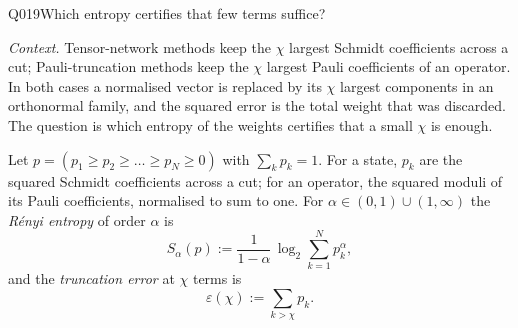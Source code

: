 \begin{entry}{Q019}{Which entropy certifies that few terms suffice?}


\begin{problem}
\emph{Context.} Tensor-network methods keep the $\chi$ largest Schmidt coefficients
across a cut; Pauli-truncation methods keep the $\chi$ largest Pauli coefficients of an
operator. In both cases a normalised vector is replaced by its $\chi$ largest components
in an orthonormal family, and the squared error is the total weight that was discarded.
The question is which entropy of the weights certifies that a small $\chi$ is enough.

Let $p=(p_1\ge p_2\ge\dots\ge p_N\ge 0)$ with $\sum_k p_k=1$. For a state, $p_k$ are the
squared Schmidt coefficients across a cut; for an operator, the squared moduli of its
Pauli coefficients, normalised to sum to one. For $\alpha\in(0,1)\cup(1,\infty)$ the
\emph{R\'enyi entropy} of order $\alpha$ is
\[
  S_\alpha(p) := \frac{1}{1-\alpha}\,\log_2 \sum_{k=1}^{N} p_k^{\alpha},
\]
and the \emph{truncation error} at $\chi$ terms is
\[
  \varepsilon(\chi) := \sum_{k>\chi} p_k .
\]


\end{problem}
\end{entry}

